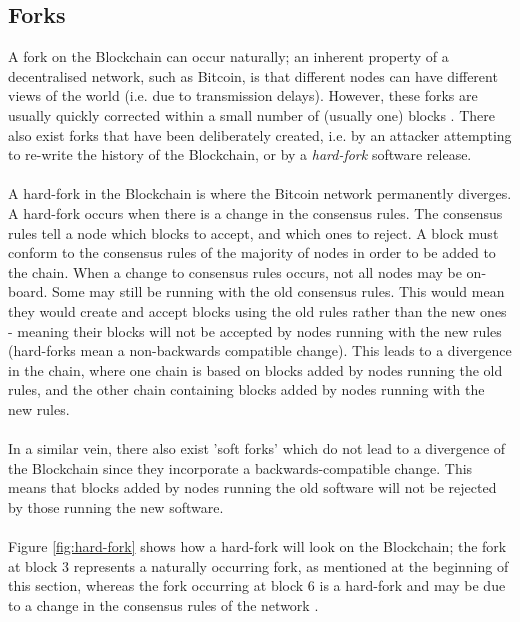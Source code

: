 \subsection{Forks}\label{background-forks}
A fork on the Blockchain can occur naturally; an inherent property of a decentralised network, such as Bitcoin, is that different nodes can have different views of the world (i.e. due to transmission delays). However, these forks are usually quickly corrected within a small number of (usually one) blocks \cite{RefWorks:doc:5c39e80ae4b0854ae611b047}. There also exist forks that have been deliberately created, i.e. by an attacker attempting to re-write the history of the Blockchain, or by a \textit{hard-fork} software release. 
\\\\
A hard-fork in the Blockchain is where the Bitcoin network permanently diverges. A hard-fork occurs when there is a change in the consensus rules. The consensus rules tell a node which blocks to accept, and which ones to reject. A block must conform to the consensus rules of the majority of nodes in order to be added to the chain. When a change to consensus rules occurs, not all nodes may be on-board. Some may still be running with the old consensus rules. This would mean they would create and accept blocks using the old rules rather than the new ones - meaning their blocks will not be accepted by nodes running with the new rules (hard-forks mean a non-backwards compatible change). This leads to a divergence in the chain, where one chain is based on blocks added by nodes running the old rules, and the other chain containing blocks added by nodes running with the new rules. 
\\\\
In a similar vein, there also exist 'soft forks' which do not lead to a divergence of the Blockchain since they incorporate a backwards-compatible change. This means that blocks added by nodes running the old software will not be rejected by those running the new software. 
\\\\
Figure \ref{fig:hard-fork} shows how a hard-fork will look on the Blockchain; the fork at block 3 represents a naturally occurring fork, as mentioned at the beginning of this section, whereas the fork occurring at block 6 is a hard-fork and may be due to a change in the consensus rules of the network \cite{RefWorks:doc:5c39e80ae4b0854ae611b047}. 

